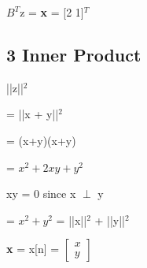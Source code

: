 \documentclass[11pt]{article}
\begin{document}
\vspace{5mm}
\begin{center}

 $B^{T}$z  = \textbf{x} = [2 1]${^T}$



\end{center}



\subsection*{3 Inner Product}
\begin{center}

||z||$^2$

\end{center}
\begin{center}

= ||x + y||$^2$

\end{center}
\begin{center}

= (x+y)(x+y)

\end{center}

\begin{center}

= $x^2 + 2xy + y^2$

\end{center}

\begin{center}

xy = 0 since x $\perp$ y

\end{center}

\begin{center}

= $x^2 + y^2$ = ||x||$^2$ + ||y||$^2$

\end{center}





\newpage

\begin{center}

\textbf{x} = x[n] = 
$
\begin{bmatrix}

x \\
y

\end{bmatrix}
$
\end{center}
\end{document}
